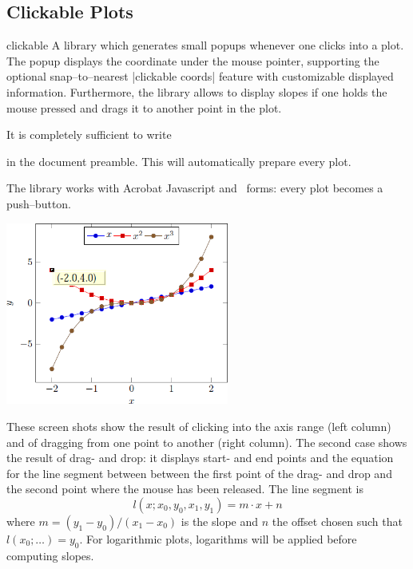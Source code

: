 \subsection{Clickable Plots}
\begin{pgfplotslibrary}{clickable}
	A library which generates small popups whenever one clicks into a plot. The popup displays the coordinate under the mouse pointer, supporting the optional snap--to--nearest |clickable coords| feature with customizable displayed information. Furthermore, the library allows to display slopes if one holds the mouse pressed and drags it to another point in the plot.


	It is completely sufficient to write 
\begin{codeexample}
\end{codeexample}
	\noindent in the document preamble. This will automatically prepare every plot.

	The library works with Acrobat Javascript and \pdf\ forms: every plot becomes a push--button. 

	\includegraphics[height=6cm]{figures/pgfplotsclickable-fig1.png}
	\hfill

	\nobreak
	These screen shots show the result of clicking into the axis range (left column) and of dragging from one point to another (right column). The second case shows the result of drag- and drop: it displays start- and end points and the equation for the line segment between between the first point of the drag- and drop and the second point where the mouse has been released. The line segment is 
	\[ l(x; x_0,y_0,x_1,y_1) = m \cdot x + n \]
	where $m = (y_1-y_0) / (x_1-x_0)$ is the slope and $n$ the offset chosen such that $l(x_0;\dotsc) = y_0$. For logarithmic plots, logarithms will be applied before computing slopes. 


\end{pgfplotslibrary}
